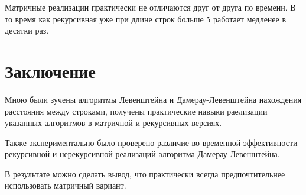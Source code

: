 \documentclass[12pt]{report}
\begin{document}


\par
Матричные реализации практически не отличаются друг от друга по времени. В то время как рекурсивная уже при длине строк больше 5 работает медленее в десятки раз.

\chapter*{Заключение}
Мною были зучены алгоритмы Левенштейна и Дамерау-Левенштейна нахождения расстояния между строками, получены практические навыки раелизации указанных алгоритмов
в матричной  и рекурсивных версиях. 

Также экспериментально было проверено различие во временной эффективности рекурсивной и нерекурсивной реализаций алгоритма Дамерау-Левенштейна.

В результате можно сделать вывод, что практически всегда предпочтительнее использовать матричный вариант.
\end{document}
